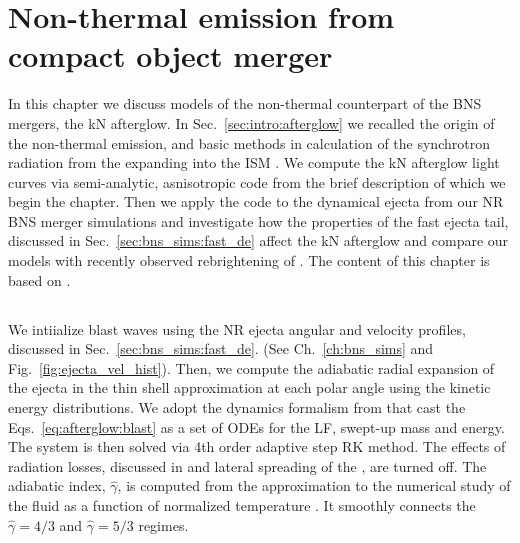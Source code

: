 
\chapter{Non-thermal emission from compact object merger} \label{ch:afterglow} 

In this chapter we discuss models of the non-thermal counterpart 
of the \ac{BNS} mergers, the \ac{kN} afterglow.
%
In Sec.~\ref{sec:intro:afterglow} we recalled the origin of the non-thermal emission, 
and basic methods in calculation of the synchrotron radiation from the expanding into the 
\ac{ISM} \blast{}.
%
We compute the \ac{kN} afterglow light curves via 
semi-analytic, asnisotropic code \pyblast{} 
from the brief description of which we begin the chapter.
%
Then we apply the code \pyblast{} to the dynamical ejecta from our \ac{NR} 
\ac{BNS} merger simulations and investigate how the properties of the 
fast ejecta tail, discussed in Sec.~\ref{sec:bns_sims:fast_de} affect the 
\ac{kN} afterglow and compare our models with recently observed rebrightening 
of \GRB{}.
%
The content of this chapter is based on \citet{Nedora:2021eoj,Hajela:2021faz}.





\section{\pyblast{}}

\def\eq{\text{equation}}
\def\eqs{\text{equations}}

%
We intiialize blast waves using the \ac{NR} ejecta angular and velocity profiles, 
discussed in Sec.~\ref{sec:bns_sims:fast_de}. 
(See Ch.~\ref{ch:bns_sims} and Fig.~\ref{fig:ejecta_vel_hist}).
%
Then, we compute the adiabatic radial expansion of the ejecta in 
the thin shell approximation at each polar angle using the kinetic 
energy distributions.
%
We adopt the \blast{} dynamics formalism from \citet{Nava:2013} that cast the 
Eqs.~\eqref{eq:afterglow:blast} as a set of \acp{ODE} for the \blast{} \ac{LF},
swept-up mass and energy. The system is then solved via 
4th order adaptive step \ac{RK} method.
The effects of radiation losses, discussed in \citet{Nava:2013} and lateral 
spreading of the \blast{}, \citep[\eg][]{Granot:2012} are turned off.
%
The adiabatic index, $\hat{\gamma}$, is computed from the approximation to the 
numerical study of the \trans{} fluid \citep[\eq~5 in][]{Service:1986} as a function 
of normalized temperature \citep[\eq~11 in][]{Peer:2012}. It smoothly connects the 
$\hat{\gamma}=4/3$ and $\hat{\gamma}=5/3$ regimes. 

